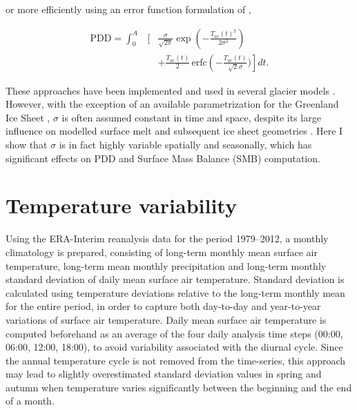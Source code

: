 \documentclass[twocolumn]{igs}
\begin{document}
or more efficiently using an error function formulation of \citet{calov-greve-2005},

\begin{eqnarray} \label{eq:calovgreve}
  \mathrm{PDD} = \int_{0}^{A} &\Big[ &
    \frac{\sigma}{\sqrt{2\pi}}
    \exp\left({-\frac{T_{ac}(t)^2}{2\sigma^2}}\right) \nonumber\\
    && + \frac{T_{ac}(t)}{2} \,
    \mathrm{erfc} \left(-\frac{T_{ac}(t)}{\sqrt{2}\sigma}\Big)
  \right]dt.
\end{eqnarray}

These approaches have been implemented and used in several glacier models \citep[e.g.][]{letreguilly-etal-1991,greve-1997,huybrechts-dewolde-1999,seddik-etal-2012,charbit-etal-2013}. However, with the exception of an available parametrization for the Greenland Ice Sheet \citep{fausto-etal-2011}, $\sigma$ is often assumed constant in time and space, despite its large influence on modelled surface melt and subsequent ice sheet geometries \citep{charbit-etal-2013}. Here I show that $\sigma$ is in fact highly variable spatially and seasonally, which has significant effects on PDD and Surface Mass Balance (SMB) computation.


\section{Temperature variability}

Using the ERA-Interim reanalysis data \citep{data:erai} for the period 1979--2012, a monthly climatology is prepared, consisting of long-term monthly mean surface air temperature, long-term mean monthly precipitation and long-term monthly standard deviation of daily mean surface air temperature. Standard deviation is calculated using temperature deviations relative to the long-term monthly mean for the entire period, in order to capture both day-to-day and year-to-year variations of surface air temperature. Daily mean surface air temperature is computed beforehand as an average of the four daily analysis time steps (00:00, 06:00, 12:00, 18:00), to avoid variability associated with the diurnal cycle. Since the annual temperature cycle is not removed from the time-series, this approach may lead to slightly overestimated standard deviation values in spring and autumn when temperature varies significantly between the beginning and the end of a month. 
\end{document}
